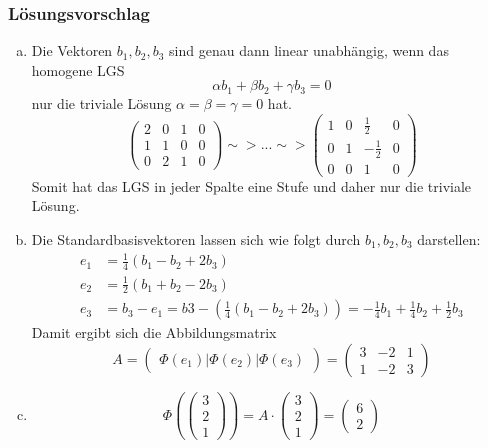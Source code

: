 \documentclass[a4paper,11pt]{scrartcl}
\begin{document}
\subsubsection*{Lösungsvorschlag}
\begin{enumerate}[a)]
\item Die Vektoren $b_1,b_2,b_3$ sind genau dann linear unabhängig, wenn das homogene LGS 
$$
\alpha b_1 +\beta b_2 + \gamma b_3 =0
$$
nur die triviale Lösung $\alpha=\beta=\gamma=0$ hat.
$$
\left(\begin{array}{ccc|c}2&0&1&0\\1&1&0&0\\0&2&1&0 \end{array}\right) \sim> ... \sim>\left(\begin{array}{ccc|c} 1&0&\frac{1}{2}&0\\ 0&1&-\frac{1}{2}&0 \\ 0&0&1&0\end{array}\right)
$$
Somit hat das LGS in jeder Spalte eine Stufe und daher nur die triviale Lösung.
\item Die Standardbasisvektoren lassen sich wie folgt durch $b_1,b_2,b_3$ darstellen:
\begin{align*}
e_1&=\frac{1}{4}(b_1-b_2+2b_3)\\
e_2&=\frac{1}{2}(b_1+b_2-2b_3)\\
e_3&=b_3-e_1=b3-(\frac{1}{4}(b_1-b_2+2b_3))=-\frac{1}{4}b_1+\frac{1}{4}b_2+\frac{1}{2}b_3
\end{align*}
Damit ergibt sich die Abbildungsmatrix
$$
A=\begin{pmatrix} \Phi(e_1)|\Phi(e_2)|\Phi(e_3) \end{pmatrix}=\begin{pmatrix} 3 & -2 &1 \\ 1&-2&3 \end{pmatrix}
$$
\item 
$$
\Phi(\begin{pmatrix} 3\\2\\1 \end{pmatrix})=A\cdot \begin{pmatrix} 3\\2\\1 \end{pmatrix}=\begin{pmatrix} 6 \\ 2 \end{pmatrix}
$$

\end{enumerate}
\end{document}
